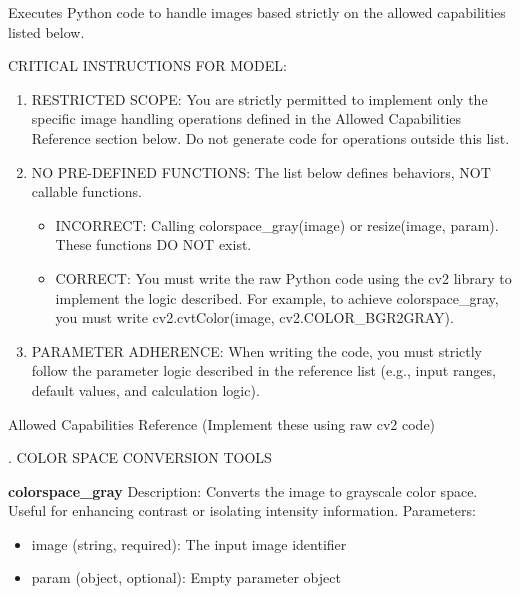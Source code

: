 \documentclass[runningheads]{llncs}
\begin{document}
\begin{tcolorbox}[
    enhanced,               
    breakable,
    colback=bluebg,         
    colframe=blueframe,     
    coltitle=white,         
    title={Code Interpreter Description},  
    fontupper=\footnotesize,             %
    fonttitle=\bfseries\sffamily, 
    arc=2.5mm,              
    boxrule=1.2pt,          
    drop fuzzy shadow,      
    left=10pt, right=10pt, top=10pt, bottom=10pt 
]


\noindent Executes Python code to handle images based strictly on the allowed capabilities listed below.

\vspace{4mm}
\noindent CRITICAL INSTRUCTIONS FOR MODEL:
\begin{enumerate}
    \item RESTRICTED SCOPE: You are strictly permitted to implement only the specific image handling operations defined in the Allowed Capabilities Reference section below. Do not generate code for operations outside this list.
    \item NO PRE-DEFINED FUNCTIONS: The list below defines behaviors, NOT callable functions.
    \begin{itemize}
        \item INCORRECT: Calling colorspace\_gray(image) or resize(image, param). These functions DO NOT exist.
        \item CORRECT: You must write the raw Python code using the cv2 library to implement the logic described. For example, to achieve colorspace\_gray, you must write cv2.cvtColor(image, cv2.COLOR\_BGR2GRAY).
    \end{itemize}
    \item PARAMETER ADHERENCE: When writing the code, you must strictly follow the parameter logic described in the reference list (e.g., input ranges, default values, and calculation logic).
\end{enumerate}

\vspace{4mm}
\tcbline
\vspace{4mm}

\noindent Allowed Capabilities Reference (Implement these using raw cv2 code)

\vspace{2mm}

. COLOR SPACE CONVERSION TOOLS
\vspace{2mm}

\noindent \textbf{colorspace\_gray}
\newline Description: Converts the image to grayscale color space. Useful for enhancing contrast or isolating intensity information.
\newline Parameters:
\begin{itemize}
    \item image (string, required): The input image identifier
    \item param (object, optional): Empty parameter object
\end{itemize}


\end{tcolorbox}
\end{document}
